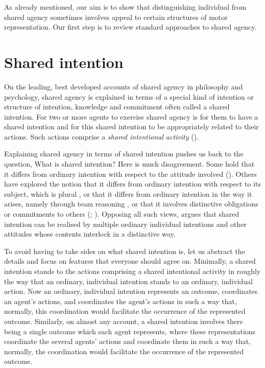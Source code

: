 \documentclass[12pt,\papersize]{extarticle}
\begin{document}
As already mentioned, our aim is to show that distinguishing individual from shared agency sometimes involves appeal to certain structures of motor representation.
Our first step is to review standard approaches to shared agency. 


\section{Shared intention}
On the leading, best developed accounts of shared agency in philosophy and psychology, 
shared agency is explained  in terms of a special kind of intention or structure of intention, knowledge and commitment often called a shared intention.
For two or more agents to exercise shared agency is for them to have a shared intention and for this shared intention to be appropriately related to their actions.
Such actions comprise a \emph{shared intentional activity} (\citealp[p.\ 142]{Bratman:1999fr}).%

Explaining shared agency in terms of shared intention pushes us back to the question, What is shared intention?
Here is much disagreement.
Some hold that it differs from
ordinary intention with respect to the attitude involved (\citealp{Searle:1990em}). 
Others have explored the notion that it differs from ordinary intention with respect to its subject, which is plural \citep{Gilbert:1992rs,helm_plural_2008}, 
or that it differs from ordinary intention in the way it arises, namely through team reasoning \citep{Gold:2007zd}, 
or that it involves distinctive obligations or commitments to others (\citealp{Gilbert:1992rs}; \citealp{Roth:2004ki}).
Opposing all such views, \citet{Bratman:1992mi,Bratman:2009lv} argues that shared intention can be realised by multiple ordinary individual intentions and other attitudes whose contents interlock in a distinctive way. 

To avoid having to take sides on what shared intention is, 
let us abstract the details
and focus on features that everyone should agree on.
Minimally, a shared intention stands to the actions comprising a shared intentional activity in roughly the way that an ordinary, individual intention stands to an ordinary, individual action.
Now an ordinary, individual intention represents an outcome, coordinates an agent's actions, and coordinates the agent's actions in such a way that, normally, this coordination would facilitate the occurrence of the represented outcome.
Similarly, 
on almost any account,
a shared intention involves there being a single outcome which each agent represents, where these representations coordinate the several agents' actions and coordinate them in such a way that, normally, the coordination would facilitate the occurrence of the represented outcome. 
\end{document}
